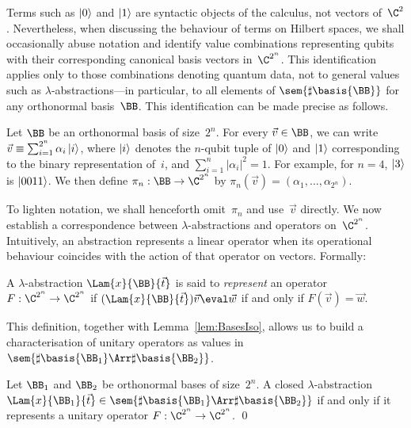 Terms such as $\left\vert{0}\right\rangle$ and $\left\vert{1}\right\rangle$ are syntactic objects of the
calculus, not vectors of~$\C^2$. Nevertheless, when discussing the behaviour of
terms on Hilbert spaces, we shall occasionally abuse notation and identify
value combinations representing qubits with their corresponding canonical
basis vectors in~$\C^{2^n}$. This identification applies only to those
combinations denoting quantum data, not to general values such as
$\lambda$-abstractions---in particular, to all elements of
$\sem{\sharp\basis{\BB}}$ for any orthonormal basis~$\BB$. This identification can
be made precise as follows.

\begin{definition}
  Let $\BB$ be an orthonormal basis of size~$2^n$. For every $\vec{v}\in \BB$, we can
  write
  \(
    \vec{v}\equiv \sum_{i=1}^{2^n}\alpha_i\left\vert{i}\right\rangle
  \),
  where $\left\vert{i}\right\rangle$ denotes the $n$-qubit tuple of $\left\vert{0}\right\rangle$ and $\left\vert{1}\right\rangle$
  corresponding to the binary representation of~$i$, and
  $\sum_{i=1}^{n}|\alpha_i|^2=1$. For example, for $n=4$, $\left\vert{3}\right\rangle$ is
  $\left\vert{0011}\right\rangle$. We then define $\pi_n:\BB\to\C^{2^n}$ by
  \(
    \pi_n(\vec{v}) = (\alpha_1,\dotsc,\alpha_{2^n})
  \).
\end{definition}

To lighten notation, we shall henceforth omit~$\pi_n$ and use~$\vec v$
directly. We now establish a correspondence between $\lambda$-abstractions and operators
on~$\C^{2^n}$. Intuitively, an abstraction represents a linear operator when its
operational behaviour coincides with the action of that operator on vectors.
Formally:

\begin{definition}
  A $\lambda$-abstraction $\Lam{x}{{\BB}}{\vec{t}}$ is said to \emph{represent}
  an operator $F:\C^{2^n}\to\C^{2^n}$ if
    $(\Lam{x}{{\BB}}{\vec{t}})\vec{v} \eval \vec{w}$
    if and only if
    $F(\vec{v}) = \vec{w}$.
\end{definition}

This definition, together with Lemma~\ref{lem:BasesIso}, allows us to build a
characterisation of unitary operators as values in
$\sem{\sharp\basis{\BB_1}\Arr\sharp\basis{\BB_2}}$.

\begin{theorem}\label{thm:characterisation}
  Let $\BB_1$ and $\BB_2$ be orthonormal bases of size~$2^n$.
  A closed $\lambda$-abstraction
  $\Lam{x}{{\BB_1}}{\vec{t}}\in\sem{\sharp\basis{\BB_1}\Arr\sharp\basis{\BB_2}}$
  if and only if it represents a unitary operator
  $F:\C^{2^n}\to\C^{2^n}$.
  \qed
\end{theorem}

